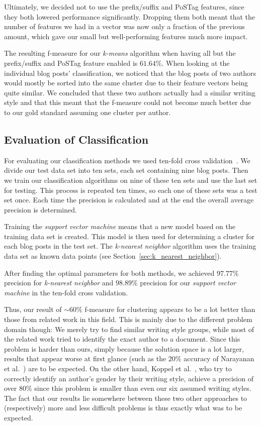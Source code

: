 Ultimately, we decided not to use the prefix/suffix and PoSTag features, since they both lowered performance significantly.
Dropping them both meant that the number of features we had in a vector was now only a fraction of the previous amount, which gave our small but well-performing features much more impact.


The resulting f-measure for our \textit{k-means} algorithm when having all but the prefix/suffix and PoSTag feature enabled is $61.64\%$.
When looking at the individual blog posts' classification, we noticed that the blog posts of two authors would mostly be sorted into the same cluster due to their feature vectors being quite similar.
We concluded that these two authors actually had a similar writing style and that this meant that the f-measure could not become much better due to our gold standard assuming one cluster per author.


\subsection{Evaluation of Classification}
\label{sec:evaluation_classification}

For evaluating our classification methods we used ten-fold cross validation~\cite{kohavi1995study}.
We divide our test data set into ten sets, each set containing nine blog posts.
Then we train our classification algorithms on nine of these ten sets and use the last set for testing.
This process is repeated ten times, so each one of these sets was a test set once.
Each time the precision is calculated and at the end the overall average precision is determined.


Training the \textit{support vector machine} means that a new model based on the training data set is created.
This model is then used for determining a cluster for each blog posts in the test set.
The \textit{k-nearest neighbor} algorithm uses the training data set as known data points (see Section~\ref{sec:k_nearest_neighbor}).


After finding the optimal parameters for both methods, we achieved $97.77\%$ precision for \textit{k-nearest neighbor} and $98.89\%$ precision for our \textit{support vector machine} in the ten-fold cross validation.


Thus, our result of $\sim60\%$ f-measure for clustering appears to be a lot better than those from related work in this field.
This is mainly due to the different problem domain though:
We merely try to find similar writing style groups, while most of the related work tried to identify the exact author to a document.
Since this problem is harder than ours, simply because the solution space is a lot larger, results that appear worse at first glance (such as the $20\%$ accuracy of Narayanan et al.~\cite{narayanan2012feasibility}) are to be expected.
On the other hand, Koppel et al.~\cite{koppel2003automatically}, who try to correctly identify an author's gender by their writing style, achieve a precision of over $80\%$ since this problem is smaller than even our six assumed writing styles.
The fact that our results lie somewhere between these two other approaches to (respectively) more and less difficult problems is thus exactly what was to be expected.